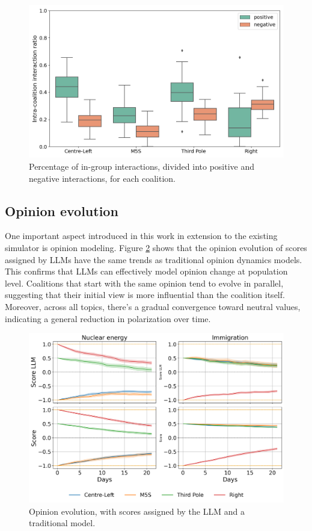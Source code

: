 \begin{figure}[h]
    \centering
    \includegraphics[width=1\linewidth]{Images/Interactions/pos_neg_in_DefaultRecSys.png}
    \caption{Percentage of in-group interactions, divided into positive and negative interactions, for each coalition.}
    \label{fig:interactions_inout}
\end{figure}


\subsection{Opinion evolution}
One important aspect introduced in this work in extension to the existing simulator is opinion modeling.
Figure \ref{fig:opinion_evolution} shows that the opinion evolution of scores assigned by LLMs have the same trends as traditional opinion dynamics models.
This confirms that LLMs can effectively model opinion change at population level.
Coalitions that start with the same opinion tend to evolve in parallel, suggesting that their initial view is more influential than the coalition itself.
Moreover, across all topics, there's a gradual convergence toward neutral values, indicating a general reduction in polarization over time.


\begin{figure}[h]
    \centering
    \includegraphics[width=1\linewidth]{Images/Opinions/d21a100m00x_RandomRecSys.png}
    \caption{Opinion evolution, with scores assigned by the LLM and a traditional model.}
    \label{fig:opinion_evolution}
\end{figure}


